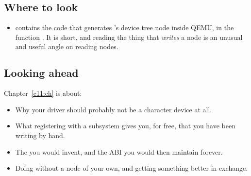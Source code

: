 \subsection*{Where to look}
\begin{itemize}
  \item {} contains the code that generates 's device
    tree node inside QEMU, in the function . It is short, and reading the
    thing that \emph{writes} a node is an unusual and useful angle on reading nodes.
\end{itemize}

\subsection*{Looking ahead}
Chapter~\ref{c11:ch} is about:
\begin{itemize}
  \item Why your driver should probably not be a character device at all.
  \item What registering with a subsystem gives you, for free, that you have been writing by hand.
  \item The  you would invent, and the ABI you would then maintain forever.
  \item Doing without a  node of your own, and getting something better in exchange.
\end{itemize}
